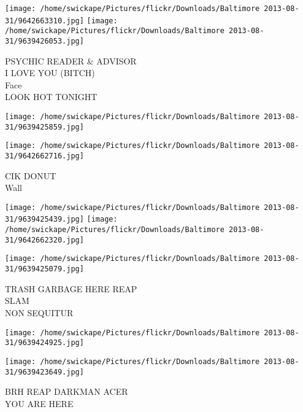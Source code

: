 \documentclass[10pt,letterpaper]{article}
\begin{document}
\texttt{[image: /home/swickape/Pictures/flickr/Downloads/Baltimore 2013-08-31/9642663310.jpg]}
\texttt{[image: /home/swickape/Pictures/flickr/Downloads/Baltimore 2013-08-31/9639426053.jpg]}

PSYCHIC READER \& ADVISOR\\
I LOVE YOU (BITCH)\\
Face\\
LOOK HOT TONIGHT
\pagebreak

\texttt{[image: /home/swickape/Pictures/flickr/Downloads/Baltimore 2013-08-31/9639425859.jpg]}

\vspace{0.25in}
\texttt{[image: /home/swickape/Pictures/flickr/Downloads/Baltimore 2013-08-31/9642662716.jpg]}

CIK DONUT\\
Wall
\pagebreak

\texttt{[image: /home/swickape/Pictures/flickr/Downloads/Baltimore 2013-08-31/9639425439.jpg]}
\texttt{[image: /home/swickape/Pictures/flickr/Downloads/Baltimore 2013-08-31/9642662320.jpg]}

\texttt{[image: /home/swickape/Pictures/flickr/Downloads/Baltimore 2013-08-31/9639425079.jpg]}

TRASH GARBAGE HERE REAP\\
SLAM\\
NON SEQUITUR
\pagebreak

\texttt{[image: /home/swickape/Pictures/flickr/Downloads/Baltimore 2013-08-31/9639424925.jpg]}

\vspace{0.25in}
\texttt{[image: /home/swickape/Pictures/flickr/Downloads/Baltimore 2013-08-31/9639423649.jpg]}

BRH REAP DARKMAN ACER\\
YOU ARE HERE
\pagebreak
\end{document}
